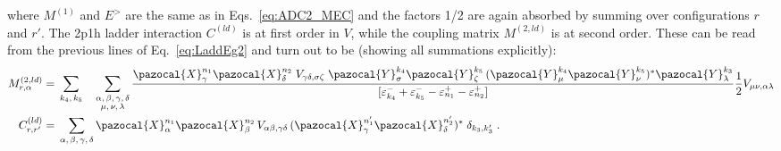 where $M^{(1)}$ and $E^>$ are the same as in Eqs.~\eqref{eq:ADC2_MEC} and the factors 1/2 are again absorbed by summing over configurations $r$ and $r'$. The 2p1h ladder interaction $C^{(ld)}$ is at first order in $V$, while the coupling matrix $ M^{(2,ld)}$ is at second order. These can be read from the previous lines of Eq.~\eqref{eq:LaddEg2} and turn out to be (showing all summations explicitly):
\begin{align}
M^{(2,ld)}_{r,\alpha} ={}&  \sum_{k_4, \, k_5} \quad \sum_{\substack{ \alpha ,\, \beta ,\, \gamma, \,  \delta \\ \mu ,\, \nu , \, \lambda}} 
  \frac{   \pazocal{X}^{n_1}_{\gamma} \pazocal{X}^{n_2}_{\delta} \;  V_{\gamma \delta, \sigma \zeta} \;
 \pazocal{Y}^{k_4}_{\sigma} \pazocal{Y}^{k_5}_{\zeta} \, (\pazocal{Y}^{k_4}_\mu \pazocal{Y}^{k_5}_\nu)^*  \pazocal{Y}^{k_3}_\lambda  }
                  {[\varepsilon^-_{k_4} + \varepsilon^-_{k_5} - \varepsilon^+_{n_1}  - \varepsilon^+_{n_2}]} \frac{1}{2} V_{\mu \nu, \alpha \lambda}
  \nonumber \\
  C^{(ld)}_{r,r'} ={}&  \sum_{ \alpha ,\, \beta ,\, \gamma ,\, \delta} \pazocal{X}^{n_1}_{\alpha} \pazocal{X}^{n_2}_{\beta}  \, V_{\alpha \beta, \gamma \delta} \, ( \pazocal{X}^{n_1'}_{\gamma} \pazocal{X}^{n_2'}_{\delta})^* \; \delta_{k_3, k_3'} \; .
\end{align}

